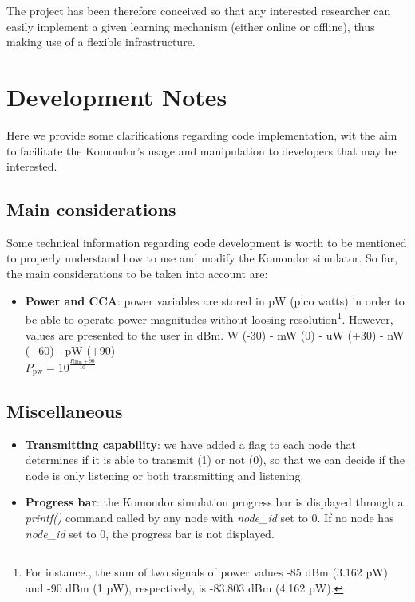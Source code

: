 \documentclass[a4paper]{article}
\begin{document}
The project has been therefore conceived so that any interested researcher can easily implement a given learning mechanism (either online or offline), thus making use of a flexible infrastructure.

\section{Development Notes}
\label{section:tutorial_and_development_notes}
Here we provide some clarifications regarding code implementation, wit the aim to facilitate the Komondor's usage and manipulation to developers that may be interested.
	
	\subsection{Main considerations}
	\label{section:development_considerations}
	Some technical information regarding code development is worth to be mentioned to properly understand how to use and modify the Komondor simulator. So far, the main considerations to be taken into account are:		
	\begin{itemize}
	\item \textbf{Power and CCA}: power variables are stored in pW (pico watts) in order to be able to operate power magnitudes without loosing resolution\footnote{For instance., the sum of two signals of power values -85 dBm (3.162 pW) and -90 dBm (1 pW), respectively, is -83.803 dBm (4.162 pW).}. However, values are presented to the user in dBm.		
	W (-30)  - mW (0)  - uW (+30) - nW (+60) - pW (+90)\\
	$P_{\text{pw}} = 10^{\frac{P_{\text{dBm}} + 90}{10}}$
	\end{itemize}

	\subsection{Miscellaneous}
	\label{section:development_miscellany}
	\begin{itemize}
	\item \textbf{Transmitting capability}: we have added a flag to each node that determines if it is able to transmit (1) or not (0), so that we can decide if the node is only listening or both transmitting and listening.
	\item \textbf{Progress bar}: the Komondor simulation progress bar is displayed through a \textit{printf()} command called by any node with \textit{node\_id} set to 0. If no node has \textit{node\_id} set to 0, the progress bar is not displayed.
	\end{itemize}
	
\end{document}
